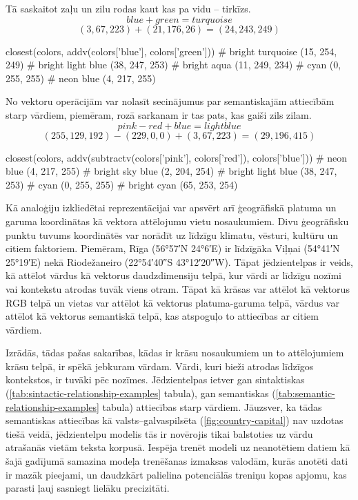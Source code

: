 Tā saskaitot zaļu un zilu rodas kaut kas pa vidu -- tirkīzs.
$$blue + green = turquoise$$
$$(3, 67, 223) + (21, 176, 26) = (24, 243, 249)$$
\begin{python}
closest(colors, addv(colors['blue'], colors['green']))
# bright turquoise (15, 254, 249)
# bright light blue (38, 247, 253)
# bright aqua (11, 249, 234)
# cyan (0, 255, 255)
# neon blue (4, 217, 255)
\end{python}

No vektoru operācijām var nolasīt secinājumus par semantiskajām attiecībām starp vārdiem, piemēram, rozā sarkanam ir tas pats, kas gaiši zils zilam.
$$pink - red + blue = light blue$$
$$(255, 129, 192) - (229, 0, 0) + (3, 67, 223) = (29, 196, 415)$$
\begin{python}
closest(colors, addv(subtractv(colors['pink'], colors['red']), colors['blue']))
# neon blue (4, 217, 255)
# bright sky blue (2, 204, 254)
# bright light blue (38, 247, 253)
# cyan (0, 255, 255)
# bright cyan (65, 253, 254)
\end{python}

Kā analoģiju izkliedētai reprezentācijai var apsvērt arī ģeogrāfiskā platuma un garuma koordinātas kā vektora attēlojumu vietu nosaukumiem. Divu ģeogrāfisku punktu tuvums koordinātēs var norādīt uz līdzīgu klimatu, vēsturi, kultūru un citiem faktoriem. Piemēram, Rīga (56°57′N 24°6′E) ir līdzīgāka Viļņai (54°41′N 25°19′E) nekā Riodežaneiro (22°54′40″S 43°12′20″W). Tāpat jēdzientelpas ir veids, kā attēlot vārdus kā vektorus daudzdimensiju telpā, kur vārdi ar līdzīgu nozīmi vai kontekstu atrodas tuvāk viens otram. Tāpat kā krāsas var attēlot kā vektorus RGB telpā un vietas var attēlot kā vektorus platuma-garuma telpā, vārdus var attēlot kā vektorus semantiskā telpā, kas atspoguļo to attiecības ar citiem vārdiem.

Izrādās, tādas pašas sakarības, kādas ir krāsu nosaukumiem un to attēlojumiem krāsu telpā, ir spēkā jebkuram vārdam. Vārdi, kuri bieži atrodas līdzīgos kontekstos, ir tuvāki pēc nozīmes. Jēdzientelpas ietver gan sintaktiskas (\ref{tab:sintactic-relationship-examples} tabula), gan semantiskas (\ref{tab:semantic-relationship-examples} tabula) attiecības starp vārdiem. Jāuzsver, ka tādas semantiskas attiecības kā valsts--galvaspilsēta (\ref{fig:country-capital}) nav uzdotas tiešā veidā, jēdzientelpu modelis tās ir novērojis tikai balstoties uz vārdu atrašanās vietām teksta korpusā. Iespēja trenēt modeli uz neanotētiem datiem kā šajā gadījumā samazina modeļa trenēšanas izmaksas valodām, kurās anotēti dati ir mazāk pieejami, un daudzkārt palielina potenciālās treniņu kopas apjomu, kas parasti ļauj sasniegt lielāku precizitāti.

